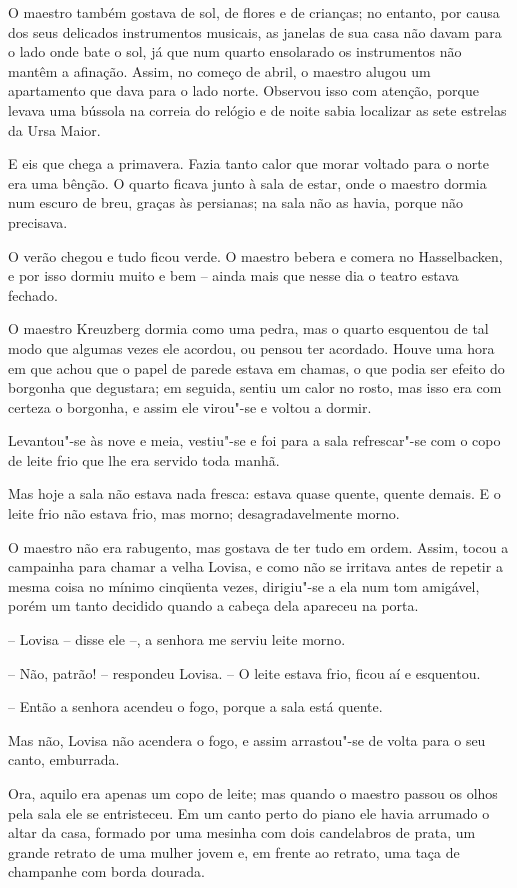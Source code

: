 O maestro também gostava de sol, de flores e de crianças; no entanto,
por causa dos seus delicados instrumentos musicais, as janelas de sua
casa não davam para o lado onde bate o sol, já que num quarto
ensolarado os instrumentos não mantêm a afinação. Assim, no começo de
abril, o maestro alugou um apartamento que dava para o lado norte.
Observou isso com atenção, porque levava uma bússola na correia do
relógio e de noite sabia localizar as sete estrelas da Ursa Maior.

E eis que chega a primavera. Fazia tanto calor que morar voltado para o
norte era uma bênção. O quarto ficava junto à sala de estar, onde o
maestro dormia num escuro de breu, graças às persianas; na sala não as
havia, porque não precisava.

O verão chegou e tudo ficou verde. O maestro bebera e comera no
Hasselbacken, e por isso dormiu muito e bem -- ainda mais que nesse dia
o teatro estava fechado.

O maestro Kreuzberg dormia como uma pedra, mas o quarto esquentou de tal
modo que algumas vezes ele acordou, ou pensou ter acordado. Houve uma
hora em que achou que o papel de parede estava em chamas, o que podia
ser efeito do borgonha que degustara; em seguida, sentiu um calor no
rosto, mas isso era com certeza o borgonha, e assim ele virou"-se e
voltou a dormir.

Levantou"-se às nove e meia, vestiu"-se e foi para a sala
refrescar"-se com o copo de leite frio que lhe era servido toda manhã.


Mas hoje a sala não estava nada fresca: estava quase quente, quente
demais. E o leite frio não estava frio, mas morno; desagradavelmente
morno.

O maestro não era rabugento, mas gostava de ter tudo em ordem. Assim,
tocou a campainha para chamar a velha Lovisa, e como não se irritava
antes de repetir a mesma coisa no mínimo cinqüenta vezes, dirigiu"-se
a ela num tom amigável, porém um tanto decidido quando a cabeça dela
apareceu na porta.

-- Lovisa -- disse ele --, a senhora me serviu leite morno.

-- Não, patrão! -- respondeu Lovisa. -- O leite estava frio, ficou aí e
esquentou.

-- Então a senhora acendeu o fogo, porque a sala está quente.

Mas não, Lovisa não acendera o fogo, e assim arrastou"-se de volta para
o seu canto, emburrada.

Ora, aquilo era apenas um copo de leite; mas quando o maestro passou os
olhos pela sala ele se entristeceu. Em um canto perto do piano ele
havia arrumado o altar da casa, formado por uma mesinha com dois
candelabros de prata, um grande retrato de uma mulher jovem e, em
frente ao retrato, uma taça de champanhe com borda dourada. 


